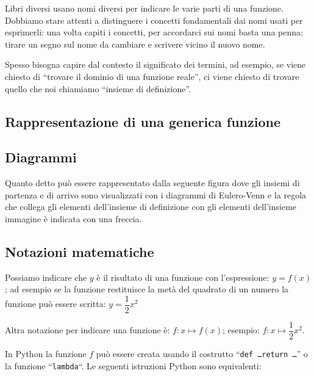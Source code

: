 Libri diversi usano nomi diversi per indicare le varie parti di una 
funzione. 
Dobbiamo stare attenti a distinguere i concetti fondamentali dai nomi 
usati per esprimerli: una volta capiti i concetti, per accordarci sui nomi 
basta una penna: tirare un segno sul nome da cambiare e scrivere vicino il 
nuovo nome.

Spesso bisogna capire dal contesto il significato dei termini, ad esempio, 
se viene chiesto di ``trovare il dominio di una funzione reale'', ci viene 
chiesto di trovare quello che noi chiamiamo ``insieme di definizione''.

\subsection{Rappresentazione di una generica funzione}
\label{sec:funzioni2_rappresentazione}

\subsection{Diagrammi}

Quanto detto può essere rappresentato dalla seguente figura dove gli 
insiemi di partenza e di arrivo sono visualizzati con i diagrammi di 
Eulero-Venn e la regola che collega gli elementi dell'insieme di definizione 
con gli elementi dell'insieme immagine è indicata con una freccia.

\begin{center}
\end{center}

\subsection{Notazioni matematiche}

Possiamo indicare che \(y\) è il risultato di una funzione con l'espressione:
\quad \(y=f(x)\); \quad
ad esempio se la funzione restituisce la metà del quadrato di un numero la 
funzione può essere scritta: \quad 
\(y=\dfrac{1}{2}x^2\)

Altra notazione per indicare una funzione è: \quad
\(f: x \mapsto f(x)\); \quad 
esempio: \quad
\(f: x \mapsto \dfrac{1}{2}x^2\).

\bigskip
In Python la funzione \(f\) può essere creata usando il costrutto 
``\texttt{def \dots return \dots}'' o la funzione ``\texttt{lambda}``.
Le seguenti istruzioni Python sono equivalenti:

